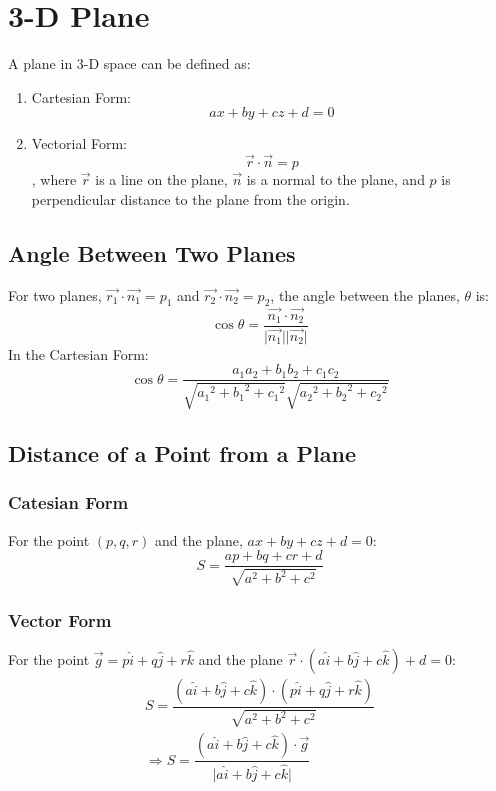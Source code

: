 \large{\chapter{3-D Plane}}
A plane in 3-D space can be defined as:
\begin{enumerate}
	\item Cartesian Form: \begin{equation} ax+by+cz+d=0 \end{equation}
	\item Vectorial Form: \begin{equation}\vec{r}\cdot\vec{n}=p\end{equation}, where $\vec{r}$ is a line on the plane, $\vec{n}$ is a normal to the plane, and $p$ is perpendicular distance to the plane from the origin.
\end{enumerate}

\section{Angle Between Two Planes}
For two planes, $\vec{r_1}\cdot\vec{n_1}=p_1$ and $\vec{r_2}\cdot\vec{n_2}=p_2$, the angle between the planes, $\theta$ is:
\begin{equation}
	\cos \theta=\dfrac{\vec{n_1}\cdot\vec{n_2}}{\lvert \vec{n_1} \rvert \lvert \vec{n_2} \rvert}
\end{equation}
In the Cartesian Form:
\begin{equation}
	\cos \theta = \dfrac{a_1a_2+b_1b_2+c_1c_2}{\sqrt{{a_1}^2+{b_1}^2+{c_1}^2}\sqrt{{a_2}^2+{b_2}^2+{c_2}^2}}
\end{equation}

\section{Distance of a Point from a Plane}
\subsection{Catesian Form}
For the point $(p,q,r)$ and the plane, $ax+by+cz+d=0$:
\begin{equation}
	S=\dfrac{ap+bq+cr+d}{\sqrt{a^2+b^2+c^2}}
\end{equation}
\subsection{Vector Form}
For the point $\vec{g}=p\hat{i}+q\hat{j}+r\hat{k}$ and the plane $\vec{r}\cdot(a\hat{i}+b\hat{j}+c\hat{k})+d=0$:
\begin{align}
	S=\dfrac{(a\hat{i}+b\hat{j}+c\hat{k})\cdot(p\hat{i}+q\hat{j}+r\hat{k})}{\sqrt{a^2+b^2+c^2}}\\
	\Rightarrow S=\dfrac{(a\hat{i}+b\hat{j}+c\hat{k})\cdot\vec{g}}{\lvert a\hat{i}+b\hat{j}+c\hat{k} \rvert}
\end{align}
